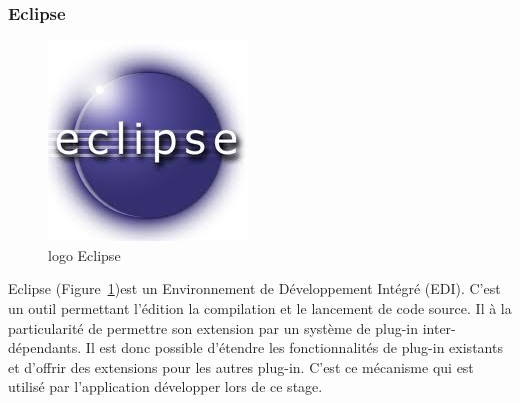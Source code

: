 \documentclass{article}
\begin{document}
	\subsubsection{Eclipse}
		\begin{figure}[!h]
		  \raggedright
		  \includegraphics[scale=0.3]{img/logo_eclipse.jpeg}
		  \caption{logo Eclipse}
		  \label{logo_eclipse}
		\end{figure}
		Eclipse (Figure~\ref{logo_eclipse})est un Environnement de Développement Intégré (EDI). C'est un outil permettant l'édition la compilation et le lancement de code source. Il à la particularité de permettre son extension par un système de plug-in inter-dépendants. Il est donc possible d'étendre les fonctionnalités de plug-in existants et d'offrir des extensions pour les autres plug-in. C'est ce mécanisme qui est utilisé par l'application développer lors de ce stage.
\end{document}
